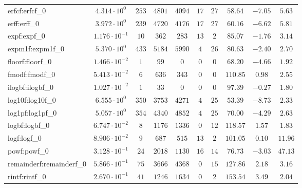 \begin{tabular}{|l|c|c|c|c|c|c|c|c|c|}
erfcf:erfcf\_0           & $ 4.314 \cdot 10^{0}  $ & $ 253    $ & $ 4801   $ & $ 4094   $ & $ 17  $ & $ 27  $ & $ 58.64       $ & $ -7.05   $ & $ 5.63    $ \\
erff:erff\_0             & $ 3.972 \cdot 10^{0}  $ & $ 239    $ & $ 4720   $ & $ 4176   $ & $ 17  $ & $ 27  $ & $ 60.16       $ & $ -6.62   $ & $ 5.81    $ \\
expf:expf\_0             & $ 1.176 \cdot 10^{-1} $ & $ 10     $ & $ 362    $ & $ 283    $ & $ 13  $ & $ 2   $ & $ 85.07       $ & $ -1.76   $ & $ 3.14    $ \\
expm1f:expm1f\_0         & $ 5.370 \cdot 10^{0}  $ & $ 433    $ & $ 5184   $ & $ 5990   $ & $ 4   $ & $ 26  $ & $ 80.63       $ & $ -2.40   $ & $ 2.70    $ \\
floorf:floorf\_0         & $ 1.466 \cdot 10^{-2} $ & $ 1      $ & $ 99     $ & $ 0      $ & $ 0   $ & $ 0   $ & $ 68.20       $ & $ -4.66   $ & $ 1.92    $ \\
fmodf:fmodf\_0           & $ 5.413 \cdot 10^{-2} $ & $ 6      $ & $ 636    $ & $ 343    $ & $ 0   $ & $ 0   $ & $ 110.85      $ & $ 0.98    $ & $ 2.55    $ \\
ilogbf:ilogbf\_0         & $ 1.027 \cdot 10^{-2} $ & $ 1      $ & $ 33     $ & $ 0      $ & $ 0   $ & $ 0   $ & $ 97.39       $ & $ -0.27   $ & $ 1.80    $ \\
log10f:log10f\_0         & $ 6.555 \cdot 10^{0}  $ & $ 350    $ & $ 3753   $ & $ 4271   $ & $ 4   $ & $ 25  $ & $ 53.39       $ & $ -8.73   $ & $ 2.33    $ \\
log1pf:log1pf\_0         & $ 5.057 \cdot 10^{0}  $ & $ 354    $ & $ 4340   $ & $ 4852   $ & $ 4   $ & $ 25  $ & $ 70.00       $ & $ -4.29   $ & $ 2.63    $ \\
logbf:logbf\_0           & $ 6.747 \cdot 10^{-2} $ & $ 8      $ & $ 1176   $ & $ 1336   $ & $ 0   $ & $ 12  $ & $ 118.57      $ & $ 1.57    $ & $ 1.83    $ \\
logf:logf\_0             & $ 8.906 \cdot 10^{-2} $ & $ 9      $ & $ 687    $ & $ 515    $ & $ 13  $ & $ 2   $ & $ 101.05      $ & $ 0.10    $ & $ 11.96   $ \\
powf:powf\_0             & $ 3.128 \cdot 10^{-1} $ & $ 24     $ & $ 2018   $ & $ 1130   $ & $ 16  $ & $ 14  $ & $ 76.73       $ & $ -3.03   $ & $ 47.13   $ \\
remainderf:remainderf\_0 & $ 5.866 \cdot 10^{-1} $ & $ 75     $ & $ 3666   $ & $ 4368   $ & $ 0   $ & $ 15  $ & $ 127.86      $ & $ 2.18    $ & $ 3.16    $ \\
rintf:rintf\_0           & $ 2.670 \cdot 10^{-1} $ & $ 41     $ & $ 1246   $ & $ 1634   $ & $ 0   $ & $ 2   $ & $ 153.54      $ & $ 3.49    $ & $ 2.04    $ \\

\end{tabular}
